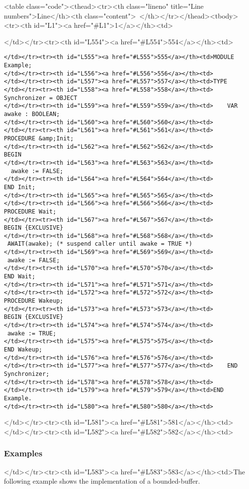 <table class="code"><thead><tr><th class="lineno" title="Line numbers">Line</th><th class="content"> </th></tr></thead><tbody><tr><th id="L1"><a href="#L1">1</a></th><td>\documentclass[a4paper,11pt]{article}
\begin{document}
</td></tr><tr><th id="L554"><a href="#L554">554</a></th><td>\begin{lstlisting}[language=Oberon,frame=none,caption=Example of object synchronization]
</td></tr><tr><th id="L555"><a href="#L555">555</a></th><td>MODULE Example;
</td></tr><tr><th id="L556"><a href="#L556">556</a></th><td>
</td></tr><tr><th id="L557"><a href="#L557">557</a></th><td>TYPE
</td></tr><tr><th id="L558"><a href="#L558">558</a></th><td>    Synchronizer = OBJECT
</td></tr><tr><th id="L559"><a href="#L559">559</a></th><td>    VAR awake : BOOLEAN;
</td></tr><tr><th id="L560"><a href="#L560">560</a></th><td>
</td></tr><tr><th id="L561"><a href="#L561">561</a></th><td>        PROCEDURE &amp;Init;
</td></tr><tr><th id="L562"><a href="#L562">562</a></th><td>        BEGIN
</td></tr><tr><th id="L563"><a href="#L563">563</a></th><td>            awake := FALSE;
</td></tr><tr><th id="L564"><a href="#L564">564</a></th><td>        END Init;
</td></tr><tr><th id="L565"><a href="#L565">565</a></th><td>
</td></tr><tr><th id="L566"><a href="#L566">566</a></th><td>        PROCEDURE Wait;
</td></tr><tr><th id="L567"><a href="#L567">567</a></th><td>        BEGIN {EXCLUSIVE}
</td></tr><tr><th id="L568"><a href="#L568">568</a></th><td>           AWAIT(awake); (* suspend caller until awake = TRUE *)
</td></tr><tr><th id="L569"><a href="#L569">569</a></th><td>           awake := FALSE;
</td></tr><tr><th id="L570"><a href="#L570">570</a></th><td>        END Wait;
</td></tr><tr><th id="L571"><a href="#L571">571</a></th><td>
</td></tr><tr><th id="L572"><a href="#L572">572</a></th><td>        PROCEDURE Wakeup;
</td></tr><tr><th id="L573"><a href="#L573">573</a></th><td>        BEGIN {EXCLUSIVE}
</td></tr><tr><th id="L574"><a href="#L574">574</a></th><td>           awake := TRUE;
</td></tr><tr><th id="L575"><a href="#L575">575</a></th><td>        END Wakeup;
</td></tr><tr><th id="L576"><a href="#L576">576</a></th><td>
</td></tr><tr><th id="L577"><a href="#L577">577</a></th><td>    END Synchronizer;
</td></tr><tr><th id="L578"><a href="#L578">578</a></th><td>
</td></tr><tr><th id="L579"><a href="#L579">579</a></th><td>END Example.
</td></tr><tr><th id="L580"><a href="#L580">580</a></th><td>\end{lstlisting}
</td></tr><tr><th id="L581"><a href="#L581">581</a></th><td>
</td></tr><tr><th id="L582"><a href="#L582">582</a></th><td>\subsubsection{Examples}
</td></tr><tr><th id="L583"><a href="#L583">583</a></th><td>The following example shows the implementation of a bounded-buffer.
\end{document}
